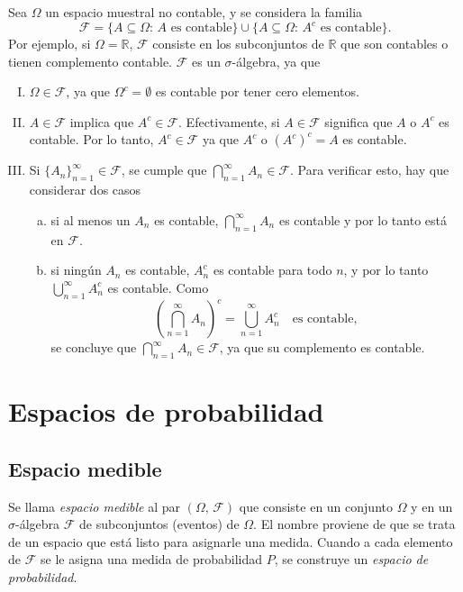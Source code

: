 \documentclass[a4paper]{report}
\begin{document}
\begin{enumerate}[(a)]
 Sea \(\Omega\) un espacio muestral no contable, y se considera la familia
 \[
  \mathcal{F}=\{A\subseteq\Omega:\,A\textrm{ es contable}\}\cup\{A\subseteq\Omega:\,A^c\textrm{ es contable}\}.
 \]
 Por ejemplo, si \(\Omega=\mathbb{R}\), \(\mathcal{F}\) consiste en los subconjuntos de \(\mathbb{R}\) que son contables o tienen complemento contable. \(\mathcal{F}\) es un \(\sigma\)-álgebra, ya que
 \begin{enumerate}[(I)]
  \item \(\Omega\in\mathcal{F}\), ya que \(\Omega^c=\emptyset\) es contable por tener cero elementos.
  \item \(A\in\mathcal{F}\) implica que \(A^c\in\mathcal{F}\). Efectivamente, si \(A\in\mathcal{F}\) significa que \(A\) o \(A^c\) es contable. Por lo tanto, \(A^c\in\mathcal{F}\) ya que \(A^c\) o \(\left(A^c\right)^c=A\) es contable.
  \item Si \(\{A_n\}_{n=1}^{\infty}\in\mathcal{F}\), se cumple que \(\bigcap_{n=1}^{\infty}A_n\in\mathcal{F}\). Para verificar esto, hay que considerar dos casos
  \begin{enumerate}[(a)]
   \item si al menos un \(A_n\) es contable, \(\bigcap_{n=1}^{\infty}A_n\) es contable y por lo tanto está en \(\mathcal{F}\).
   \item si ningún \(A_n\) es contable, \(A_n^c\) es contable para todo \(n\), y por lo tanto \(\bigcup_{n=1}^{\infty}A_n^c\) es contable. Como
   \[
    \left(\bigcap_{n=1}^{\infty}A_n\right)^c=\bigcup_{n=1}^{\infty}A_n^c\quad\textrm{es contable},
   \]
   se concluye que \(\bigcap_{n=1}^{\infty}A_n\in\mathcal{F}\), ya que su complemento es contable.
  \end{enumerate}
 \end{enumerate}
\end{enumerate}

\section{Espacios de probabilidad}

\subsection{Espacio medible}

Se llama \emph{espacio medible} al par \((\Omega,\,\mathcal{F})\) que consiste en un conjunto \(\Omega\) y en un \(\sigma\)-álgebra \(\mathcal{F}\) de subconjuntos (eventos) de \(\Omega\). El nombre proviene de que se trata de un espacio que está listo para asignarle una medida. Cuando a cada elemento de \(\mathcal{F}\) se le asigna una medida de probabilidad \(P\), se construye un \emph{espacio de probabilidad}.
\end{document}
